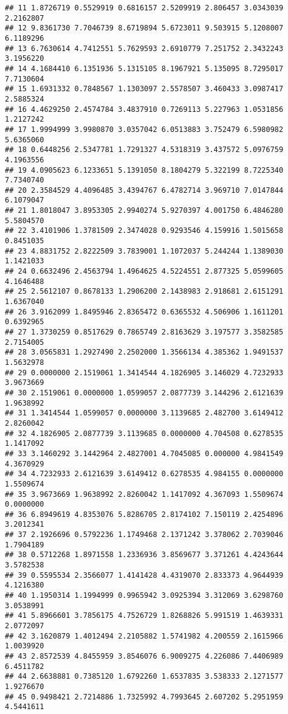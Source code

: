 \documentclass[
]{article}
\begin{document}
\begin{verbatim}
## 11 1.8726719 0.5529919 0.6816157 2.5209919 2.806457 3.0343039 2.2162807
## 12 9.8361730 7.7046739 8.6719894 5.6723011 9.503915 5.1208007 6.1189296
## 13 6.7630614 4.7412551 5.7629593 2.6910779 7.251752 2.3432243 3.1956220
## 14 4.1684410 6.1351936 5.1315105 8.1967921 5.135095 8.7295017 7.7130604
## 15 1.6931332 0.7848567 1.1303097 2.5578507 3.460433 3.0987417 2.5885324
## 16 4.4629250 2.4574784 3.4837910 0.7269113 5.227963 1.0531856 1.2127242
## 17 1.9994999 3.9980870 3.0357042 6.0513883 3.752479 6.5980982 5.6365060
## 18 0.6448256 2.5347781 1.7291327 4.5318319 3.437572 5.0976759 4.1963556
## 19 4.0905623 6.1233651 5.1391050 8.1804279 5.322199 8.7225340 7.7340740
## 20 2.3584529 4.4096485 3.4394767 6.4782714 3.969710 7.0147844 6.1079047
## 21 1.8018047 3.8953305 2.9940274 5.9270397 4.001750 6.4846280 5.5804570
## 22 3.4101906 1.3781509 2.3474028 0.9293546 4.159916 1.5015658 0.8451035
## 23 4.8831752 2.8222509 3.7839001 1.1072037 5.244244 1.1389030 1.1421033
## 24 0.6632496 2.4563794 1.4964625 4.5224551 2.877325 5.0599605 4.1646488
## 25 2.5612107 0.8678133 1.2906200 2.1438983 2.918681 2.6151291 1.6367040
## 26 3.9162099 1.8495946 2.8365472 0.6365532 4.506906 1.1611201 0.6392965
## 27 1.3730259 0.8517629 0.7865749 2.8163629 3.197577 3.3582585 2.7154005
## 28 3.0565831 1.2927490 2.2502000 1.3566134 4.385362 1.9491537 1.5632978
## 29 0.0000000 2.1519061 1.3414544 4.1826905 3.146029 4.7232933 3.9673669
## 30 2.1519061 0.0000000 1.0599057 2.0877739 3.144296 2.6121639 1.9638992
## 31 1.3414544 1.0599057 0.0000000 3.1139685 2.482700 3.6149412 2.8260042
## 32 4.1826905 2.0877739 3.1139685 0.0000000 4.704508 0.6278535 1.1417092
## 33 3.1460292 3.1442964 2.4827001 4.7045085 0.000000 4.9841549 4.3670929
## 34 4.7232933 2.6121639 3.6149412 0.6278535 4.984155 0.0000000 1.5509674
## 35 3.9673669 1.9638992 2.8260042 1.1417092 4.367093 1.5509674 0.0000000
## 36 6.8949619 4.8353076 5.8286705 2.8174102 7.150119 2.4254896 3.2012341
## 37 2.1926696 0.5792236 1.1749468 2.1371242 3.378062 2.7039046 1.7904189
## 38 0.5712268 1.8971558 1.2336936 3.8569677 3.371261 4.4243644 3.5782538
## 39 0.5595534 2.3566077 1.4141428 4.4319070 2.833373 4.9644939 4.1216380
## 40 1.1950314 1.1994999 0.9965942 3.0925394 3.312069 3.6298760 3.0538991
## 41 5.8966601 3.7856175 4.7526729 1.8268826 5.991519 1.4639331 2.0772097
## 42 3.1620879 1.4012494 2.2105882 1.5741982 4.200559 2.1615966 1.0039920
## 43 2.8572539 4.8455959 3.8546076 6.9009275 4.226086 7.4406989 6.4511782
## 44 2.6638881 0.7385120 1.6792260 1.6537835 3.538333 2.1271577 1.9276670
## 45 0.9498421 2.7214886 1.7325992 4.7993645 2.607202 5.2951959 4.5441611

\end{verbatim}
\end{document}
